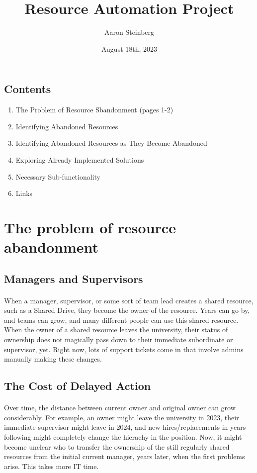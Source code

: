 \documentclass{article}
\author{Aaron Steinberg}
\title{Resource Automation Project}
\date{August 18th, 2023}
\begin{document}
\maketitle

\begin{tcolorbox}
    \section*{Contents}
    \begin{enumerate}
        \item The Problem of Resource Sbandonment (pages 1-2)
        \item Identifying Abandoned Resources
        \item Identifying Abandoned Resources as They Become Abandoned
        \item Exploring Already Implemented Solutions
        \item Necessary Sub-functionality
        \item Links
    \end{enumerate}
\end{tcolorbox}

\newpage
\section{The problem of resource abandonment}
\subsection*{Managers and Supervisors}
\paragraph*{} When a manager, supervisor, or some sort of team lead creates a shared resource, such as a Shared Drive,
they become the owner of the resource. Years can go by, and teams can grow, and many different people can use this shared resource.
When the owner of a shared resource leaves the university, their status of ownership does not magically pass down to their immediate subordinate or supervisor, yet.
Right now, lots of support tickets come in that involve admins manually making these changes.

\subsection*{The Cost of Delayed Action}
\paragraph*{} Over time, the distance between current owner and original owner can grow considerably.
For example, an owner might leave the university in 2023, their immediate supervisor might leave in 2024, and new hires/replacements in years following might completely change the hierachy in the position.
Now, it might become unclear who to transfer the ownership of the still regularly shared resources from the initial current manager, years later, when the first problems arise. This takes more IT time.
\end{document}

